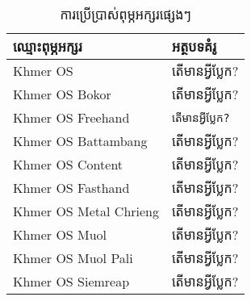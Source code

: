 \documentclass[12pt,a4paper]{article}
\newcommand{\textbb}[1]{\begingroup\bbfamily#1\endgroup}
\newcommand{\textct}[1]{\begingroup\ctfamily#1\endgroup}
\newcommand{\textfh}[1]{\begingroup\fhfamily#1\endgroup}
\newcommand{\textmc}[1]{\begingroup\mcfamily#1\endgroup}
\newcommand{\textml}[1]{\begingroup\mlfamily#1\endgroup}
\newcommand{\textmp}[1]{\begingroup\mpfamily#1\endgroup}
\newcommand{\textsr}[1]{\begingroup\srfamily#1\endgroup}
\let\texten\textenglish
\begin{document}
	\begin{table}[h]
		\centering
		\begin{tabulary}{\textwidth}{|L|L|}
			\hline
			ឈ្មោះពុម្ភអក្សរ & អត្ថបទគំរូ\\
			\hline
			\texten{Khmer OS} & តើមានអ្វីប្លែក?\\
			\texten{Khmer OS Bokor} & \textsf{តើមានអ្វីប្លែក?}\\
			\texten{Khmer OS Freehand} & \texttt{តើមានអ្វីប្លែក?}\\
			\hline
			\texten{Khmer OS Battambang} & \textbb{តើមានអ្វីប្លែក?}\\
			\texten{Khmer OS Content} & \textct{តើមានអ្វីប្លែក?}\\
			\texten{Khmer OS Fasthand} & \textfh{តើមានអ្វីប្លែក?}\\
			\texten{Khmer OS Metal Chrieng} & \textmc{តើមានអ្វីប្លែក?}\\
			\texten{Khmer OS Muol} & \textml{តើមានអ្វីប្លែក?}\\
			\texten{Khmer OS Muol Pali} & \textmp{តើមានអ្វីប្លែក?}\\
			\texten{Khmer OS Siemreap} & \textsr{តើមានអ្វីប្លែក?}\\
			\hline
		\end{tabulary}
		\caption{ការប្រើប្រាស់ពុម្ភអក្សរផ្សេងៗ}
	\end{table}
\end{document}
